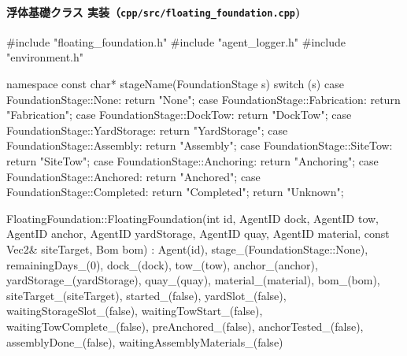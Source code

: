 \documentclass[10pt,letterpaper]{jsarticle}
\begin{document}
\paragraph{浮体基礎クラス 実装（\texttt{cpp/src/floating\_foundation.cpp})}
\begin{cppcode}
#include "floating_foundation.h"
#include "agent_logger.h"
#include "environment.h"

namespace {
    const char* stageName(FoundationStage s) {
        switch (s) {
        case FoundationStage::None: return "None";
        case FoundationStage::Fabrication: return "Fabrication";
        case FoundationStage::DockTow: return "DockTow";
        case FoundationStage::YardStorage: return "YardStorage";
        case FoundationStage::Assembly: return "Assembly";
        case FoundationStage::SiteTow: return "SiteTow";
        case FoundationStage::Anchoring: return "Anchoring";
        case FoundationStage::Anchored: return "Anchored";
        case FoundationStage::Completed: return "Completed";
        }
        return "Unknown";
    }
}

FloatingFoundation::FloatingFoundation(int id, AgentID dock, AgentID tow, AgentID anchor,
                                       AgentID yardStorage, AgentID quay,
                                       AgentID material, const Vec2& siteTarget,
                                       Bom bom)
    : Agent(id), stage_(FoundationStage::None), remainingDays_(0),
      dock_(dock), tow_(tow), anchor_(anchor), yardStorage_(yardStorage),
      quay_(quay), material_(material), bom_(bom), siteTarget_(siteTarget),
      started_(false), yardSlot_(false),
      waitingStorageSlot_(false), waitingTowStart_(false), waitingTowComplete_(false),
      preAnchored_(false), anchorTested_(false), assemblyDone_(false),
      waitingAssemblyMaterials_(false) {}


\end{cppcode}
\end{document}
